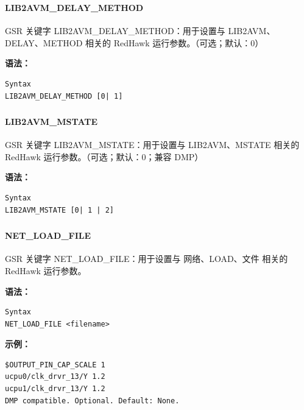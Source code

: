 \subsubsection{}
\paragraph*{LIB2AVM_DELAY_METHOD}

GSR 关键字 LIB2AVM_DELAY_METHOD：用于设置与 LIB2AVM、DELAY、METHOD 相关的 RedHawk 运行参数。（可选；默认：0）

\textbf{语法：}
\begin{lstlisting}
Syntax
LIB2AVM_DELAY_METHOD [0| 1]
\end{lstlisting}

\subsubsection{}
\paragraph*{LIB2AVM_MSTATE}

GSR 关键字 LIB2AVM_MSTATE：用于设置与 LIB2AVM、MSTATE 相关的 RedHawk 运行参数。（可选；默认：0；兼容 DMP）

\textbf{语法：}
\begin{lstlisting}
Syntax
LIB2AVM_MSTATE [0| 1 | 2]
\end{lstlisting}

\subsubsection{}
\paragraph*{NET_LOAD_FILE}

GSR 关键字 NET_LOAD_FILE：用于设置与 网络、LOAD、文件 相关的 RedHawk 运行参数。

\textbf{语法：}
\begin{lstlisting}
Syntax
NET_LOAD_FILE <filename>
\end{lstlisting}

\textbf{示例：}
\begin{lstlisting}
$OUTPUT_PIN_CAP_SCALE 1
ucpu0/clk_drvr_13/Y 1.2
ucpu1/clk_drvr_13/Y 1.2
DMP compatible. Optional. Default: None.
\end{lstlisting}

